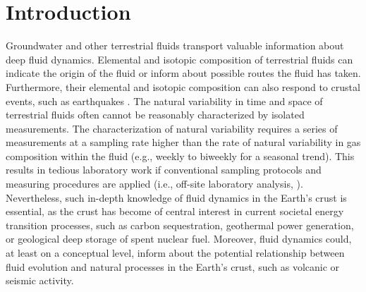 \section{Introduction}
Groundwater and other terrestrial fluids transport valuable information about deep fluid dynamics. 
Elemental and isotopic composition of terrestrial fluids can indicate the origin of the fluid or inform about possible routes the fluid has taken.
Furthermore, their elemental and isotopic composition can also respond to crustal events, such as earthquakes \citep{ide2020kumamoto}.
The natural variability in time and space of terrestrial fluids often cannot be reasonably characterized by isolated measurements. 
The characterization of natural variability requires a series of measurements at a sampling rate higher than the rate of natural variability in gas composition within the fluid (e.g., weekly to biweekly for a seasonal trend).  
This results in tedious laboratory work if conventional sampling protocols and measuring procedures are applied (i.e., off-site laboratory analysis, \cite{beyerle2000mass}).
Nevertheless, such in-depth knowledge of fluid dynamics in the Earth's crust is essential, as the crust has become of central interest in current societal energy transition processes, such as carbon sequestration, geothermal power generation, or geological deep storage of spent nuclear fuel.
Moreover, fluid dynamics could, at least on a conceptual level, inform about the potential relationship between fluid evolution and natural processes in the Earth's crust, such as volcanic or seismic activity. 

